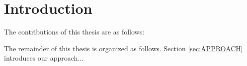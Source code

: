 
\section{Introduction} \label{sec:INTRODUCTION}



The contributions of this thesis are as follows:

The remainder of this thesis is organized as follows. Section \ref{sec:APPROACH} introduces our approach...
